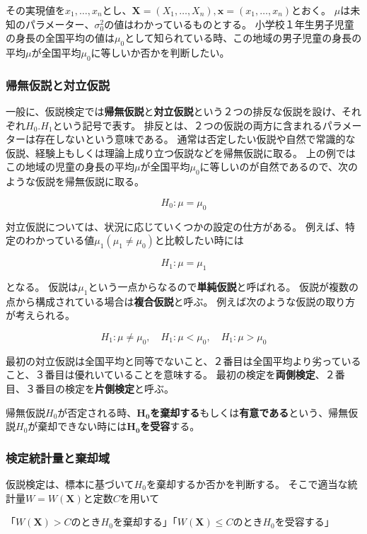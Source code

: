 \documentclass{article}
\begin{document}
その実現値を$x_1, \ldots, x_n$とし、$\bm{X}=(X_1, \ldots, X_n), \bm{x}=(x_1, \ldots,x_n)$とおく。
$\mu$は未知のパラメーター、$\sigma_0^2$の値はわかっているものとする。
小学校１年生男子児童の身長の全国平均の値は$\mu_0$として知られている時、この地域の男子児童の身長の平均$\mu$が全国平均$\mu_0$に等しいか否かを判断したい。


\subsubsection{帰無仮説と対立仮説}

一般に、仮説検定では\textbf{帰無仮説}と\textbf{対立仮説}という２つの排反な仮説を設け、それぞれ$H_0.H_1$という記号で表す。
排反とは、２つの仮説の両方に含まれるパラメーターは存在しないという意味である。
通常は否定したい仮説や自然で常識的な仮説、経験上もしくは理論上成り立つ仮説などを帰無仮説に取る。
上の例ではこの地域の児童の身長の平均$\mu$が全国平均$\mu_0$に等しいのが自然であるので、次のような仮説を帰無仮説に取る。


$$
H_0: \mu = \mu_0
$$

対立仮説については、状況に応じていくつかの設定の仕方がある。
例えば、特定のわかっている値$\mu_1(\mu_1 \neq \mu_0)$と比較したい時には

$$
H_1: \mu = \mu_1
$$

となる。
仮説は$\mu_1$という一点からなるので\textbf{単純仮説}と呼ばれる。
仮説が複数の点から構成されている場合は\textbf{複合仮説}と呼ぶ。
例えば次のような仮説の取り方が考えられる。

$$
H_1: \mu \neq \mu_0, \quad H_1: \mu < \mu_0, \quad H_1: \mu > \mu_0
$$

最初の対立仮説は全国平均と同等でないこと、２番目は全国平均より劣っていること、３番目は優れいていることを意味する。
最初の検定を\textbf{両側検定}、２番目、３番目の検定を\textbf{片側検定}と呼ぶ。

帰無仮説$H_0$が否定される時、\textbf{$\bm{H_0}$を棄却する}もしくは\textbf{有意である}という、帰無仮説$H_0$が棄却できない時には\textbf{$\bm{H_0}$を受容}する。

\subsubsection{検定統計量と棄却域}

仮説検定は、標本に基づいて$H_0$を棄却するか否かを判断する。
そこで適当な統計量$W=W(\bm{X})$と定数$C$を用いて

「$W(\bm{X})>C$のとき$H_0$を棄却する」「$W(\bm{X}) \leq C$のとき$H_0$を受容する」
\end{document}
